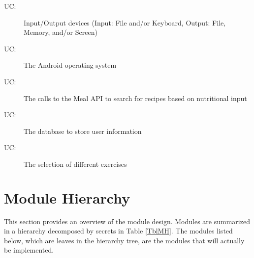 \documentclass[12pt, titlepage]{article}
\newcounter{ucnum}
\newcommand{\uctheucnum}{UC\theucnum}
\begin{document}
\begin{description}
	\item[ \uctheucnum \label{ucIO}:] Input/Output devices
	(Input: File and/or Keyboard, Output: File, Memory, and/or Screen)
	\item[ \uctheucnum \label{uc2}:] The Android operating system
	\item[ \uctheucnum \label{uc3}:] The calls to the Meal API to search for recipes based on nutritional input
	\item[ \uctheucnum \label{uc4}:] The database to store user information
	\item[ \uctheucnum \label{uc5}:] The selection of different exercises
\end{description}

\section{Module Hierarchy} \label{SecMH}

This section provides an overview of the module design. Modules are summarized
in a hierarchy decomposed by secrets in Table \ref{TblMH}. The modules listed
below, which are leaves in the hierarchy tree, are the modules that will
actually be implemented.
\end{document}
